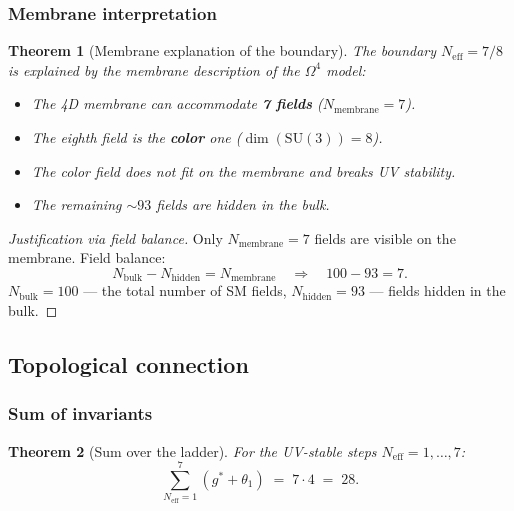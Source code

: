 \documentclass[11pt,a4paper]{article}
\newcommand{\SU}{\ensuremath{\mathrm{SU}}}
\newcommand{\Om}{\ensuremath{\Omega^4}}
\newtheorem{theorem}{Theorem}[section]
\theoremstyle{definition}
\begin{document}
\subsubsection{Membrane interpretation}

\begin{theorem}[Membrane explanation of the boundary]
\label{thm:membrane-explanation}
The boundary $N_{\text{eff}} = 7/8$ is explained by the membrane description
of the $\Om$ model:
\begin{itemize}
    \item The 4D membrane can accommodate \textbf{7 fields} ($N_{\text{membrane}} = 7$).
    \item The eighth field is the \textbf{color} one ($\dim(\SU(3)) = 8$).
    \item The color field \emph{does not fit} on the membrane and breaks
          UV stability.
    \item The remaining $\sim 93$ fields are hidden in the bulk.
\end{itemize}
\end{theorem}

\begin{proof}[Justification via field balance]
Only $N_{\text{membrane}} = 7$ fields are visible on the membrane.
Field balance:
\begin{equation}
    N_{\text{bulk}} - N_{\text{hidden}} = N_{\text{membrane}}
    \quad\Longrightarrow\quad
    100 - 93 = 7.
\end{equation}
$N_{\text{bulk}} = 100$ --- the total number of SM fields,
$N_{\text{hidden}} = 93$ --- fields hidden in the bulk.
\end{proof}

\subsection{Topological connection}
\label{subsec:frg-topology}

\subsubsection{Sum of invariants}

\begin{theorem}[Sum over the ladder]
\label{thm:sum-28}
For the UV-stable steps $N_{\text{eff}} = 1, \ldots, 7$:
\begin{equation}
    \boxed{
    \sum_{N_{\text{eff}} = 1}^{7} (g^* + \theta_1) \;=\; 7 \cdot 4 \;=\; 28.
    }
    \label{eq:sum-28-main}
\end{equation}
\end{theorem}
\end{document}
